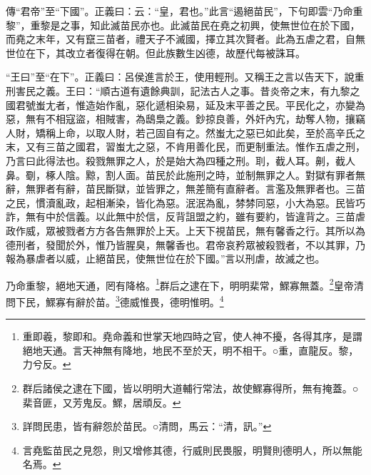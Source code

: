 {\noindent\zhuan{}\fzbyks 傳“君帝”至“下國”。正義曰：云：“皇，君也。”此言“遏絕苗民”，下句即雲“乃命重黎”，重黎是之事，知此滅苗民亦也。此滅苗民在堯之初興，使無世位在於下國，而堯之末年，又有竄三苗者，禮天子不滅國，擇立其次賢者。此為五虐之君，自無世位在下，其改立者復得在朝。但此族數生凶德，故歷代每被誅耳。 \par}

{\noindent\shu{}\fzkt “王曰”至“在下”。正義曰：呂侯進言於王，使用輕刑。又稱王之言以告天下，說重刑害民之義。王曰：“順古道有遺餘典訓，記法古人之事。昔炎帝之末，有九黎之國君號蚩尢者，惟造始作亂，惡化遞相染易，延及末平善之民。平民化之，亦變為惡，無有不相寇盜，相賊害，為鴟梟之義。鈔掠良善，外奸內宄，劫奪人物，攘竊人財，矯稱上命，以取人財，若己固自有之。然蚩尢之惡已如此矣，至於高辛氏之末，又有三苗之國君，習蚩尢之惡，不肯用善化民，而更制重法。惟作五虐之刑，乃言曰此得法也。殺戮無罪之人，於是始大為四種之刑。刵，截人耳。劓，截人鼻。劅，椓人陰。黥，割人面。苗民於此施刑之時，並制無罪之人。對獄有罪者無辭，無罪者有辭，苗民斷獄，並皆罪之，無差簡有直辭者。言濫及無罪者也。三苗之民，慣瀆亂政，起相漸染，皆化為惡。泯泯為亂，棼棼同惡，小大為惡。民皆巧詐，無有中於信義。以此無中於信，反背詛盟之約，雖有要約，皆違背之。三苗虐政作威，眾被戮者方方各告無罪於上天。上天下視苗民，無有馨香之行。其所以為德刑者，發聞於外，惟乃皆腥臭，無馨香也。君帝哀矜眾被殺戮者，不以其罪，乃報為暴虐者以威，止絕苗民，使無世位在於下國。”言以刑虐，故滅之也。 \par}

乃命重黎，絕地天通，罔有降格。\footnote{重即羲，黎即和。堯命義和世掌天地四時之官，使人神不擾，各得其序，是謂絕地天通。言天神無有降地，地民不至於天，明不相干。○重，直龍反。黎，力兮反。}群后之逮在下，明明棐常，鰥寡無蓋。\footnote{群后諸侯之逮在下國，皆以明明大道輔行常法，故使鰥寡得所，無有掩蓋。○棐音匪，又芳鬼反。鰥，居頑反。}皇帝清問下民，鰥寡有辭於苗。\footnote{詳問民患，皆有辭怨於苗民。○清問，馬云：“清，訊。”}德威惟畏，德明惟明。\footnote{言堯監苗民之見怨，則又增修其德，行威則民畏服，明賢則德明人，所以無能名焉。}


